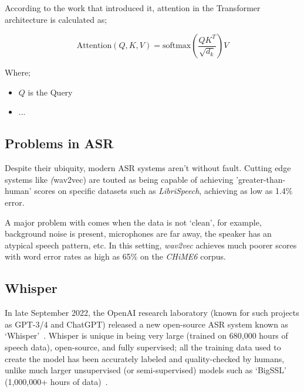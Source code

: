 According to the work that introduced it\cite{vaswani2017attention}, attention in the Transformer architecture is calculated as;

\[ \text{Attention}(Q,K,V) = \text{softmax}(\frac{QK^T}{\sqrt{d_k}})V \]

Where;

\begin{itemize}
        \item $Q$ is the Query
        \item ...
\end{itemize}



\subsection{Problems in ASR}

Despite their ubiquity, modern ASR systems aren't without fault.
Cutting edge systems like \emph(wav2vec) are touted as being capable of achieving 'greater-than-human' scores on specific datasets\cite{wav2vec2,bigssl,chung2021} such as \emph{LibriSpeech}\cite{librispeech}, achieving as low as 1.4\% error\cite{zhang2020}.

A major problem with comes when the data is not `clean', for example, background noise is present, microphones are far away, the speaker has an atypical speech pattern, etc. 
In this setting, \emph{wav2vec} achieves much poorer scores with word error rates as high as 65\%\cite{whisper} on the \emph{CHiME6} corpus\cite{chime6}.


\subsection{Whisper}

In late September 2022, the OpenAI research laboratory (known for such projects as GPT-3/4 and ChatGPT) released a new open-source ASR system known as `Whisper'~\cite{whisper}.
Whisper is unique in being very large (trained on 680,000 hours of speech data), open-source, and fully supervised;
all the training data used to create the model has been accurately labeled and quality-checked by humans, unlike much larger unsupervised (or semi-supervised) models such as `BigSSL' (1,000,000+ hours of data)~\cite{bigssl}.

